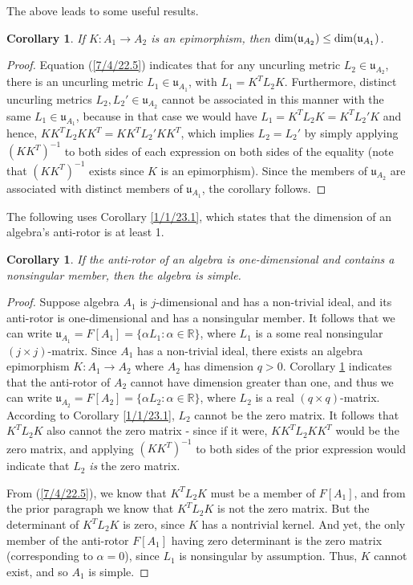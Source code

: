 \documentclass{amsart}
\numberwithin{equation}{section}
\newtheorem{corollary}[theorem]{Corollary}
\theoremstyle{definition}
\numberwithin{theorem}{section}
\begin{document}
The above leads to some useful results.  

\begin{corollary} \label{8/17/22.5} If $K:A_1\rightarrow A_2$ is an epimorphism, then ${\rm dim}(\mathfrak{u}_{A_2}) \le {\rm dim}(\mathfrak{u}_{A_1})$. \end{corollary}  

\begin{proof}   Equation (\ref{7/4/22.5}) indicates that for any uncurling metric $L_2\in \mathfrak{u}_{A_2}$, there is an uncurling metric $L_1\in \mathfrak{u}_{A_1}$, with $L_1 = K^T L_2 K$.   Furthermore, distinct uncurling metrics $L_2,L_2'\in \mathfrak{u}_{A_2}$ cannot be associated in this manner with the same $L_1\in \mathfrak{u}_{A_1}$, because in that case we would have $L_1  = K^T L_2 K = K^T L_2' K$ and hence, $KK^T L_2 KK^T = KK^T L_2' KK^T$, which implies $L_2=L_2'$ by simply applying $(KK^T)^{-1}$ to both sides of each expression on both sides of the equality (note that $(KK^T)^{-1}$ exists since $K$ is an epimorphism). Since the members of  $ \mathfrak{u}_{A_2}$ are associated with distinct members of $ \mathfrak{u}_{A_1}$, the corollary follows.   
   \end{proof}

The following uses Corollary \ref{1/1/23.1}, which states that the dimension of an algebra's anti-rotor is at least 1. 

\begin{corollary}\label{8/17/22.1} If the anti-rotor of an algebra is one-dimensional and contains a nonsingular member, then the algebra is simple. \end{corollary}

\begin{proof} Suppose algebra $A_1$ is $j$-dimensional and has a non-trivial ideal, and its anti-rotor is one-dimensional and has a nonsingular member.  It follows that we can write $\mathfrak{u}_{A_1} = F[A_1] = \{\alpha L_1:\alpha\in \mathbb{R}\}$, where $L_1$ is a some real nonsingular $(j\times j)$-matrix.  Since $A_1$ has a non-trivial ideal, there exists an algebra epimorphism $K:A_1\rightarrow A_2$ where $A_2$ has dimension $q>0$.  Corollary \ref{8/17/22.5} indicates that the anti-rotor of $A_2$ cannot have dimension greater than one, and thus we can write $\mathfrak{u}_{A_2} = F[A_2] = \{\alpha L_2:\alpha\in \mathbb{R}\}$, where $L_2$ is a real $(q\times q)$-matrix.  According to Corollary \ref{1/1/23.1}, $L_2$ cannot be the zero matrix. It follows that $K^T L_2 K$ also cannot the zero matrix - since if it were, $KK^T L_2 KK^T$ would be the zero matrix, and applying $(KK^T)^{-1}$ to both sides of the prior expression would indicate that $L_2$ {\it is} the zero matrix.  

From (\ref{7/4/22.5}), we know that $ K^T L_2 K$ must be a member of $F[A_1]$, and from the prior paragraph we know that $ K^T L_2 K$ is not the zero matrix.  But the determinant of $K^T L_2 K$ is zero, since $K$ has a  nontrivial kernel.  And yet, the only member of the anti-rotor $F[A_1]$ having zero determinant is the zero matrix (corresponding to $\alpha=0$), since $L_1$ is nonsingular by assumption.   Thus, $K$ cannot exist, and so $A_1$ is simple. \end{proof}
\end{document}
